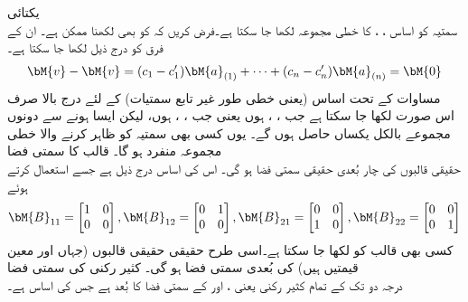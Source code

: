 \quad یکتائی\\
سمتیہ  کو اساس ، ،  کا خطی مجموعہ  لکھا جا سکتا ہے۔فرض کریں کہ  کو  بھی لکھنا ممکن ہے۔ ان کے فرق  کو  درج ذیل لکھا جا سکتا ہے۔
\begin{align*}
\bM{v}-\bM{v}=(c_1-c_1')\bM{a}_{(1)}+\cdots+(c_n-c_n')\bM{a}_{(n)}=\bM{0}
\end{align*} 
مساوات  کے تحت اساس (یعنی خطی طور غیر تابع سمتیات) کے لئے درج بالا صرف اس صورت لکھا جا سکتا ہے جب
 ، ،  ہوں یعنی جب ، ،  ہوں، لیکن ایسا ہونے سے دونوں مجموعے بالکل یکساں حاصل ہوں گے۔ یوں کسی بھی سمتیہ کو ظاہر کرنے والا خطی مجموعہ  منفرد ہو گا۔
\quad قالب کا سمتی فضا\\
حقیقی  قالبوں کی چار بُعدی حقیقی سمتی فضا ہو گی۔ اس کی اساس درج ذیل ہے جسے استعمال کرتے ہوئے
\begin{align}
\bM{B}_{11}=\begin{bmatrix} 1&0\\0&0 \end{bmatrix}, \bM{B}_{12}=\begin{bmatrix} 0&1\\0&0 \end{bmatrix}, \bM{B}_{21}=\begin{bmatrix} 0&0\\1&0 \end{bmatrix}, \bM{B}_{22}=\begin{bmatrix} 0&0\\0&1 \end{bmatrix}
\end{align}
 کسی بھی  قالب  کو  لکھا جا سکتا ہے۔اسی طرح حقیقی  حقیقی قالبوں (جہاں  اور  معین قیمتیں ہیں) کی  بُعدی سمتی فضا ہو گی۔ 
\quad کثیر رکنی کی سمتی فضا\\
درجہ دو تک کے تمام کثیر رکنی یعنی ،  اور   کے سمتی فضا کا بُعد  ہے جس کی اساس  ہے۔

